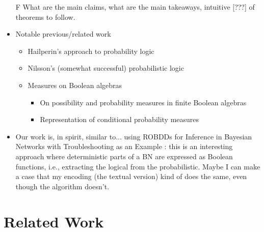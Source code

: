 \documentclass{article}
\theoremstyle{definition}
\theoremstyle{remark}
\begin{document}
\begin{itemize}
\item[F] What are the main claims, what are the main takeaways, intuitive [???]
  of theorems to follow.
\item Notable previous/related work
  \begin{itemize}
  \item Hailperin's approach to probability logic
    \cite{DBLP:journals/ndjfl/Hailperin84}
  \item Nilsson's (somewhat successful) probabilistic logic
    \cite{DBLP:journals/ai/Nilsson86,DBLP:journals/ai/Nilsson93}
  \item Measures on Boolean algebras
    \begin{itemize}
    \item On possibility and probability measures in finite Boolean algebras
      \cite{DBLP:journals/soco/CastineiraCT02}
    \item Representation of conditional probability measures
      \cite{krauss1968representation}
    \end{itemize}
  \end{itemize}
\item Our work is, in spirit, similar to... using ROBDDs for Inference in
  Bayesian Networks with Troubleshooting as an Example
  \cite{DBLP:conf/uai/NielsenWJK00}: this is an interesting approach where
  deterministic parts of a BN are expressed as Boolean functions, i.e.,
  extracting the logical from the probabilistic. Maybe I can make a case that my
  encoding (the textual version) kind of does the same, even though the
  algorithm doesn't.
\end{itemize}

\section{Related Work}
\end{document}
